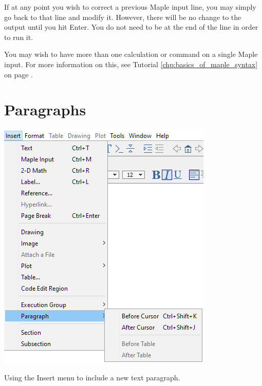 \begin{maplegroup}
\begin{mapleinput}
\end{mapleinput}
\mapleresult
\begin{maplelatex}
\end{maplelatex}
\end{maplegroup}
\begin{maplegroup}
\begin{mapleinput}
\end{mapleinput}
\mapleresult
\begin{maplelatex}
\end{maplelatex}
\end{maplegroup}

If at any point you wish to correct a previous Maple input line, you may simply go back to that line and modify it. However, there will be no change to the output until you hit Enter. You do not need to be at the end of the line in order to run it.

You may wish to have more than one calculation or command on a single Maple input. For more information on this, see Tutorial \ref{chp:basics_of_maple_syntax} on page \pageref{chp:basics_of_maple_syntax}.

\section{Paragraphs}
\label{sec:paragraphs}

\begin{marginfigure}
\includegraphics[scale=0.5]{tutorials/figures/InsertParagraph.png}
\caption{Using the Insert menu to include a new text paragraph.}
\end{marginfigure}

